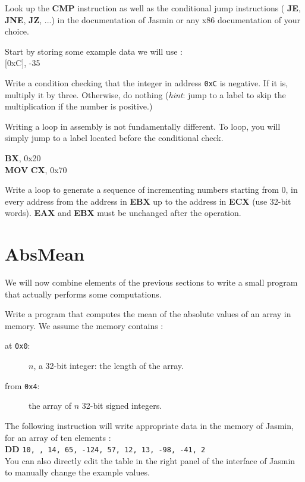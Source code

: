 \documentclass[a4paper, 11pt]{article}
\newenvironment{instruction}%
{\vspace{15pt}
	\noindent\begin{Sbox}
		\begin{minipage}{\textwidth}}%
		{\end{minipage}
	\end{Sbox}	
\shadowbox{\TheSbox} \vspace{10pt}}
\newcommand{\asmop}[1]{{\sffamily \bfseries \color{asmblue} #1}}
\newcommand{\asmreg}[1]{{\sffamily \bfseries \color{asmgreen} #1}}
\begin{document}
Look up the \asmop{CMP} instruction as well as the conditional jump instructions (\asmop{JE}, \asmop{JNE}, \asmop{JZ}, ...) in the documentation of \textsf{Jasmin} or any x86 documentation of your choice.

\begin{instruction}
	
	Start by storing some example data we will use :\\
	
	{\ttfamily \asmop{MOV} [0xC], -35 \\}
	
	Write a condition checking that the integer in address \texttt{0xC} is negative. If it is, multiply it by three. Otherwise, do nothing (\emph{hint}: jump to a label to skip the multiplication if the number is positive.)

\end{instruction}


Writing a loop in assembly is not fundamentally different. To loop, you will simply jump to a label located before the conditional check.

\begin{instruction}
	
	{\ttfamily \asmop{MOV} \asmreg{BX}, 0x20 \\
		\asmop{MOV} \asmreg{CX}, 0x70 \\}	
	
Write a loop to generate a sequence of incrementing numbers 
starting from 0, in every address from the address in \asmreg{EBX} 
up to the address in \asmreg{ECX} (use 32-bit words).
\asmreg{EAX} and \asmreg{EBX} must be unchanged after the operation.
\end{instruction}


\section{AbsMean}

We will now combine elements of the previous sections to write a small program that actually performs some computations. 

\begin{instruction}

Write a program that computes the mean of the absolute values of an array in memory.  
We assume the memory contains :
\begin{description}
	\item[at \texttt{0x0}:] $n$, a 32-bit integer: the length of the array.
	\item[from \texttt{0x4}:] the array of $n$ 32-bit signed integers.
\end{description}
 	 
The following instruction will write appropriate data in the memory of \textsf{Jasmin}, for an array of ten elements : \\

\asmop{DD} \qquad \texttt{10, ,  14,  65, -124, 57, 12, 13, -98, -41, 2} \\
 
	  
You can also directly edit the table in the right panel of the interface of \textsf{Jasmin} to manually change the example values.
\end{instruction}
\end{document}

